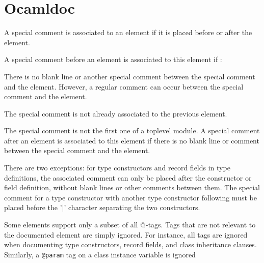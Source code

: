 \section{Ocamldoc}

A special comment is associated to an element if it is placed before
or after the element.


A special comment before an element is associated to this element if :


There is no blank line or another special comment between the special
comment and the element. However, a regular comment can occur between
the special comment and the element.


The special comment is not already associated to the previous element.


The special comment is not the first one of a toplevel module.
A special comment after an element is associated to this element if
there is no blank line or comment between the special comment and the
element.

There are two exceptions: for type constructors and record fields in
type definitions, the associated comment can only be placed after the
constructor or field definition, without blank lines or other comments
between them. The special comment for a type constructor with another
type constructor following must be placed before the '|' character
separating the two constructors.



Some elements support only a subset of all @-tags. Tags that are not
relevant to the documented element are simply ignored. For instance,
all tags are ignored when documenting type constructors, record
fields, and class inheritance clauses. Similarly, a \verb|@param| tag on a
class instance variable is ignored

